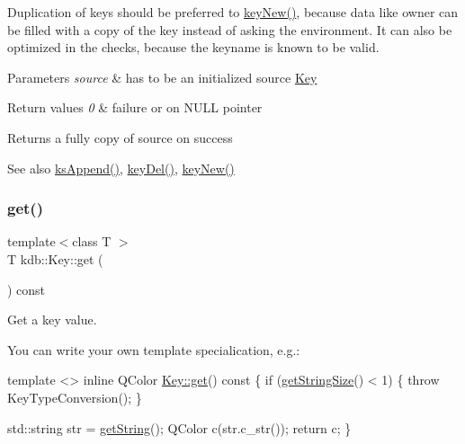 Duplication of keys should be preferred to \hyperlink{group__key_gad23c65b44bf48d773759e1f9a4d43b89}{key\+New()}, because data like owner can be filled with a copy of the key instead of asking the environment. It can also be optimized in the checks, because the keyname is known to be valid.


\begin{DoxyParams}{Parameters}
{\em source} & has to be an initialized source \hyperlink{classkdb_1_1Key}{Key} \\
\hline
\end{DoxyParams}

\begin{DoxyRetVals}{Return values}
{\em 0} & failure or on N\+U\+LL pointer \\
\hline
\end{DoxyRetVals}
\begin{DoxyReturn}{Returns}
a fully copy of source on success 
\end{DoxyReturn}
\begin{DoxySeeAlso}{See also}
\hyperlink{group__keyset_ga21eb9c3a14a604ee3a8bdc779232e7b7}{ks\+Append()}, \hyperlink{group__key_ga3df95bbc2494e3e6703ece5639be5bb1}{key\+Del()}, \hyperlink{group__key_gad23c65b44bf48d773759e1f9a4d43b89}{key\+New()} 
\end{DoxySeeAlso}
\mbox{\label{classkdb_1_1Key_ac558a1f1b2cb50d77fbabcbb24950c05}} 
\subsubsection{\texorpdfstring{get()}{get()}}
{\footnotesize\ttfamily template$<$class T $>$ \\
T kdb\+::\+Key\+::get (\begin{DoxyParamCaption}{ }\end{DoxyParamCaption}) const\hspace{0.3cm}{\ttfamily [inline]}}



Get a key value. 

You can write your own template specialication, e.\+g.\+: 
\begin{DoxyCode}
\textcolor{keyword}{template} <>
\textcolor{keyword}{inline} QColor \hyperlink{classkdb_1_1Key_ac558a1f1b2cb50d77fbabcbb24950c05}{Key::get}()\textcolor{keyword}{ const}
\textcolor{keyword}{}\{
        \textcolor{keywordflow}{if} (\hyperlink{classkdb_1_1Key_a4cfc9941a93a94b306b8264d0d21abc2}{getStringSize}() < 1)
        \{
                \textcolor{keywordflow}{throw} KeyTypeConversion();
        \}

        std::string str = \hyperlink{classkdb_1_1Key_af612ede3a73e57b317a65e40e7f9e01b}{getString}();
        QColor c(str.c\_str());
        \textcolor{keywordflow}{return} c;
\}
\end{DoxyCode}


